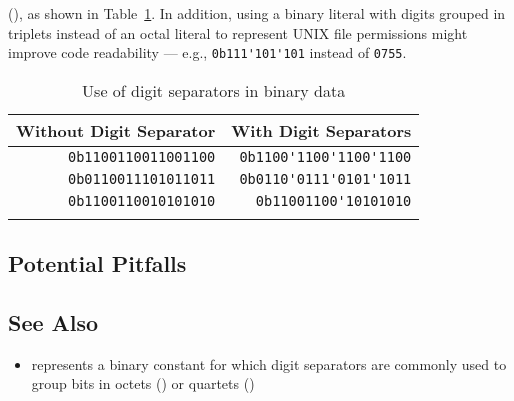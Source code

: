 (), as shown in Table~\ref{digitseparator-table2}. In addition, using a binary literal with digits grouped in triplets instead of an octal literal to represent UNIX file permissions might improve code readability --- e.g., \lstinline!0b111'101'101! instead of \lstinline!0755!.\begin{table}[h!]
\begin{center}
\begin{threeparttable}
\caption{Use of digit separators in binary data}\label{digitseparator-table2}\vspace{1.5ex}
{\small \begin{tabular}{c|c}
\thickhline
\rowcolor[gray]{.9} {\sffamily\bfseries Without Digit Separator} & {\sffamily\bfseries With Digit Separators} \\\hline
\multicolumn{1}{r|}{\lstinline!0b1100110011001100!} & \multicolumn{1}{r}{\lstinline!0b1100'1100'1100'1100!} \\ \hline
\multicolumn{1}{r|}{\lstinline!0b0110011101011011!} & \multicolumn{1}{r}{\lstinline!0b0110'0111'0101'1011!} \\ \hline
\multicolumn{1}{r|}{\lstinline!0b1100110010101010!} & \multicolumn{1}{r}{\lstinline!0b11001100'10101010!} \\
\thickhline
\end{tabular}
} %
\end{threeparttable}
\end{center}
\end{table}

\subsection[Potential Pitfalls]{Potential Pitfalls}\label{potential-pitfalls}

\hspace{\fill}

\subsection[See Also]{See Also}\label{see-also}

\begin{itemize}
\item{represents a binary constant for which digit separators are commonly used to group bits in octets () or quartets ()}
\end{itemize}


